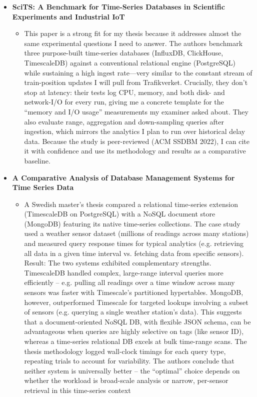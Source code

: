 \documentclass[11pt]{article}
\begin{document}
\begin{itemize}
\begin{itemize}
    \end{itemize}
    \item[] \textbf{SciTS: A Benchmark for Time-Series Databases in Scientific Experiments and Industrial IoT}
    \begin{itemize}
        \item[] This paper is a strong fit for my thesis because it addresses almost the same experimental questions I need to answer. The authors benchmark three purpose-built time-series databases (InfluxDB, ClickHouse, TimescaleDB) against a conventional relational engine (PostgreSQL) while sustaining a high ingest rate—very similar to the constant stream of train-position updates I will pull from Trafikverket. Crucially, they don’t stop at latency: their tests log CPU, memory, and both disk- and network-I/O for every run, giving me a concrete template for the “memory and I/O usage” measurements my examiner asked about. They also evaluate range, aggregation and down-sampling queries after ingestion, which mirrors the analytics I plan to run over historical delay data. Because the study is peer-reviewed (ACM SSDBM 2022), I can cite it with confidence and use its methodology and results as a comparative baseline.
    \end{itemize}
    \item[] \textbf{A Comparative Analysis of Database Management Systems for Time Series Data}
    \begin{itemize}
        \item[] A Swedish master’s thesis compared a relational time-series extension (TimescaleDB on PostgreSQL) with a NoSQL document store (MongoDB) featuring its native time-series collections. The case study used a weather sensor dataset (millions of readings across many stations) and measured query response times for typical analytics (e.g. retrieving all data in a given time interval vs. fetching data from specific sensors). Result: The two systems exhibited complementary strengths. TimescaleDB handled complex, large-range interval queries more efficiently – e.g. pulling all readings over a time window across many sensors was faster with Timescale’s partitioned hypertables. MongoDB, however, outperformed Timescale for targeted lookups involving a subset of sensors (e.g. querying a single weather station’s data). This suggests that a document-oriented NoSQL DB, with flexible JSON schema, can be advantageous when queries are highly selective on tags (like sensor ID), whereas a time-series relational DB excels at bulk time-range scans. The thesis methodology logged wall-clock timings for each query type, repeating trials to account for variability. The authors conclude that neither system is universally better – the “optimal” choice depends on whether the workload is broad-scale analysis or narrow, per-sensor retrieval in this time-series context

\end{itemize}
\end{itemize}
\end{document}
